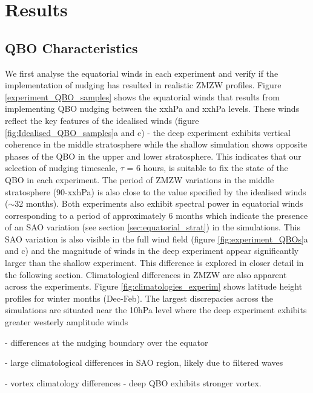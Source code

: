 \section{Results}
\subsection{QBO Characteristics}
We first analyse the equatorial winds in each experiment and verify if the implementation of nudging has resulted in realistic ZMZW profiles. Figure \ref{experiment_QBO_samples} shows the equatorial winds that results from implementing QBO nudging between the xxhPa and xxhPa levels. These winds reflect the key features of the idealised winds (figure \ref{fig:Idealised_QBO_samples}a and c) - the deep experiment exhibits vertical coherence in the middle stratosphere while the shallow simulation shows opposite phases of the QBO in the upper and lower stratosphere. This indicates that our selection of nudging timescale, $\tau$ = 6 hours, is suitable to fix the state of the QBO in each experiment. The period of ZMZW variations in the middle stratosphere (90-xxhPa) is also close to the value specified by the idealised winds ($\sim$32 months). Both experiments also exhibit spectral power in equatorial winds  corresponding to a period of approximately 6 months which indicate the presence of an SAO variation (see section \ref{sec:equatorial_strat}) in the simulations. This SAO variation is also visible in the full wind field (figure \ref{fig:experiment_QBOs}a and c) and the magnitude of winds in the deep experiment appear significantly larger than the shallow experiment. This difference is explored in closer detail in the following section. Climatological differences in ZMZW are also apparent across the experiments. Figure \ref{fig:climatologies_experim} shows latitude height profiles for winter months (Dec-Feb). The largest discrepacies across the simulations are situated near the 10hPa level where the deep experiment exhibits greater westerly amplitude winds

- differences at the nudging boundary over the equator

- large climatological differences in SAO region, likely due to filtered waves

- vortex climatology differences - deep QBO exhibits stronger vortex. 

